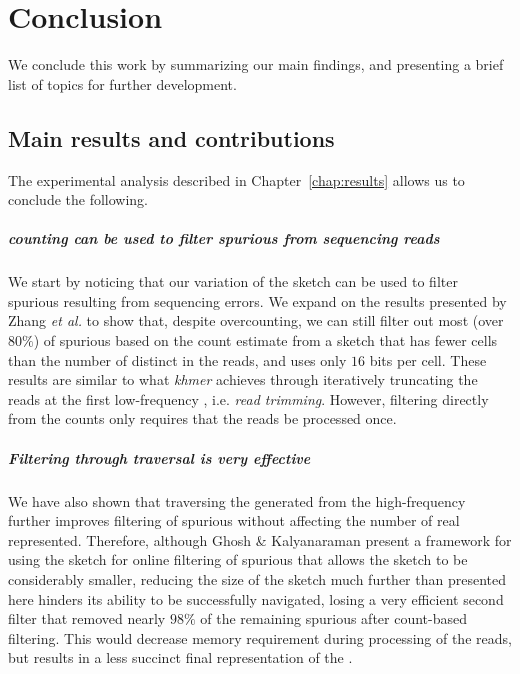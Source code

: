 \chapter{Conclusion}

We conclude this work by summarizing our main findings, and presenting a brief list of topics for further development.

\section{Main results and contributions}

The experimental analysis described in Chapter~\ref{chap:results} allows us to conclude the following.

\paragraph*{ \kmer counting can be used to filter spurious  from sequencing reads}

We start by noticing that our \dBCM variation of the \cm sketch can be used to filter spurious \kmers resulting from sequencing errors.
We expand on the results presented by Zhang \emph{et al.} \cite{Zhang2014} to show that, despite overcounting, we can still filter out most (over $80\%$) of spurious  based on the count estimate from a \cm sketch that has fewer cells than the number of distinct  in the reads, and uses only $16$ bits per cell. These results are similar to what \emph{khmer} achieves through iteratively truncating the reads at the first low-frequency \kmer \cite{Zhang2014}, i.e. \emph{read trimming}. However, filtering directly from the counts only requires that the reads be processed once.

\paragraph*{Filtering through traversal is very effective}

We have also shown that traversing the \dBG generated from the high-frequency  further improves filtering of spurious  without affecting the number of real  represented. Therefore, although Ghosh \& Kalyanaraman \cite{Ghosh2019} present a framework for using the \cm sketch for online filtering of spurious  that allows the sketch to be considerably smaller, reducing the size of the \cm sketch much further than presented here hinders its ability to be successfully navigated, losing a very efficient second filter that removed nearly $98\%$ of the remaining spurious  after count-based filtering. This would decrease memory requirement during processing of the reads, but results in a less succinct final representation of the \dBG.

